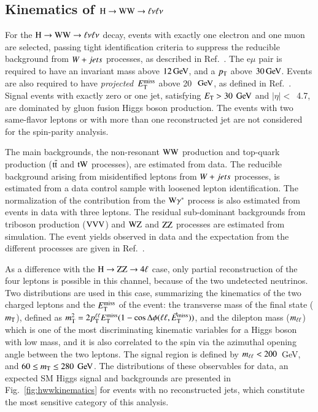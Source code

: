 \subsection{Kinematics of $\mathrm{H}\to\mathrm{W}\mathrm{W}\to\ell\nu\ell\nu$}
\label{sec:hwwkinematics}

For the $\mathrm{H}\to\mathrm{W}\mathrm{W}\to\ell\nu\ell\nu$ decay, events with exactly one electron and one
muon are selected, passing tight identification criteria to suppress
the reducible background from $W+jets$ processes, as described in
Ref.~\cite{Chatrchyan:2013iaa}.  The $\mathrm{e}\mu$ pair is required to
have an invariant mass above $12\,\mathrm{Ge\hspace{-.08em}V}$, and a $p_{\mathrm{T}}$ above
$30\,\mathrm{Ge\hspace{-.08em}V}$. Events are also required to have
\textit{projected}~$E_{\mathrm{T}}^{\mathrm{miss}}$ above 20~$\,\mathrm{Ge\hspace{-.08em}V}$, as defined in
Ref.~\cite{Chatrchyan:2013iaa}. Signal events with exactly zero or one
jet, satisfying $E_{\mathrm{T}}>30~\,\mathrm{Ge\hspace{-.08em}V}$ and $|\eta|<$~4.7, are dominated by
gluon fusion Higgs boson production.  The events with two same-flavor
leptons or with more than one reconstructed jet are not considered for
the spin-parity analysis.


The main backgrounds, the non-resonant $\mathrm{W}\mathrm{W}$ production and
top-quark production ($\mathrm{t}\overline{\mathrm{t}}$ and $\mathrm{t}\mathrm{W}$ processes), are estimated
from data.  The reducible background arising from misidentified
leptons from $W+jets$ processes, is estimated from a data control
sample with loosened lepton identification. The normalization of the
contribution from the $\mathrm{W}\gamma^*$ process is also estimated from
events in data with three leptons. The residual sub-dominant
backgrounds from triboson production ($\mathrm{V}\mathrm{V}\mathrm{V}$) and $\mathrm{W}\mathrm{Z}$ and
$\mathrm{Z}\mathrm{Z}$ processes are estimated from simulation.
%
The event yields observed in data and the expectation from 
the different processes are given in Ref.~\cite{Chatrchyan:2013iaa}.

As a difference with the $\mathrm{H}\to\mathrm{Z}\mathrm{Z}\to4\ell$ case, only partial reconstruction
of the four leptons is possible in this channel, because of the two
undetected neutrinos. Two distributions are used in this case,
summarizing the kinematics of the two charged leptons and the $E_{\mathrm{T}}^{\mathrm{miss}}$
of the event: the transverse mass of the final state ($m_{\mathrm{T}}$), defined
as $m_{\mathrm{T}}^2 = 2 p_{\mathrm{T}}^{\ell\ell} E_{\mathrm{T}}^{\mathrm{miss}} (1-\cos\Delta\phi(\ell\ell,\vec{E}_\mathrm{T}^{\mathrm{miss}}))$, and the dilepton mass
($m_{\ell\ell}$) which is one of the most discriminating kinematic variables
for a Higgs boson with low mass, and it is also correlated to the spin
via the azimuthal opening angle between the two leptons.
%
The signal region is defined by $m_{\ell\ell} < 200$~GeV, and $60 \leq m_{\mathrm{T}}
\leq 280~\,\mathrm{Ge\hspace{-.08em}V}$.  The distributions of these observables for data, an
expected SM Higgs signal and backgrounds are presented in
Fig.~\ref{fig:hwwkinematics} for events with no reconstructed jets,
which constitute the most sensitive category of this analysis.
%

